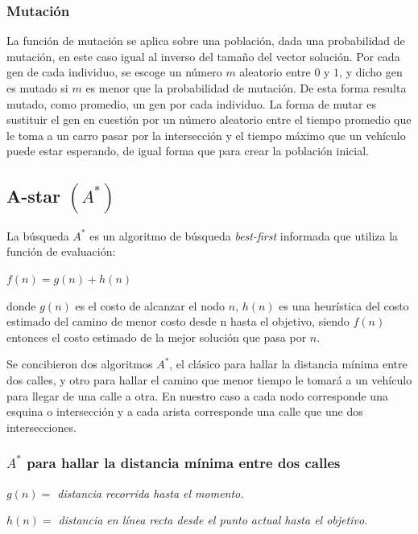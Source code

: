 \documentclass[colorinlistoftodos,twoside,twocolumn]{article} %
\begin{document}
	\subsubsection{Mutación}
	
	La funci\'on de mutaci\'on se aplica sobre una poblaci\'on, dada una probabilidad de mutaci\'on, en este caso igual al inverso del tama\~no del vector soluci\'on. Por cada gen de cada individuo, se escoge un n\'umero $ m $ aleatorio entre $ 0 $ y $ 1 $, y dicho gen es mutado si $ m $ es menor que la probabilidad de mutaci\'on. De esta forma resulta mutado,  como promedio, un gen por cada individuo. La forma de mutar es sustituir el gen en cuesti\'on por un n\'umero aleatorio entre el tiempo promedio que le toma a un carro pasar por la intersección y el tiempo máximo que un vehículo puede estar esperando, de igual forma que para crear la poblaci\'on inicial.
	
	
	\subsection{A-star $(A^{*}) $}
	
	La b\'usqueda $ A^{*} $ es un algoritmo de búsqueda \textit{best-first} informada que utiliza la función de evaluación:
	\begin{center}
		$ f(n) = g(n) + h(n) $
	\end{center}
	donde $ g(n) $ es el costo de alcanzar el nodo $ n $, $ h(n) $ es una heur\'istica del costo estimado del camino de menor costo desde n hasta el objetivo, siendo $ f(n) $ entonces el costo estimado de la mejor soluci\'on que pasa por $ n $.
	
	Se concibieron dos algoritmos $ A^{*} $, el cl\'asico para hallar la distancia m\'inima entre dos calles, y otro para hallar el camino que menor tiempo le tomar\'a a un veh\'iculo para llegar de una calle a otra. En nuestro caso a cada nodo corresponde una esquina o intersecci\'on y a cada arista corresponde una calle que une dos intersecciones.
	
	\subsubsection{$ A^{*} $ para hallar la distancia m\'inima entre dos calles}
	
	\begin{center}
	
	\textit{$ g(n) = $ distancia recorrida hasta el momento.}
	
	\vspace{0.5em}
	\textit{$ h(n) = $ distancia en l\'inea recta desde el punto actual hasta el objetivo.}
	
	\end{center}
	
\end{document}
